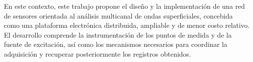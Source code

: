 	En este contexto, este trabajo propone el diseño y la implementación de una red de sensores orientada al análisis multicanal de ondas superficiales, concebida como una plataforma electrónica distribuida, ampliable y de menor costo relativo. El desarrollo comprende la instrumentación de los puntos de medida y de la fuente de excitación, así como los mecanismos necesarios para coordinar la adquisición y recuperar posteriormente los registros obtenidos.
	
	

